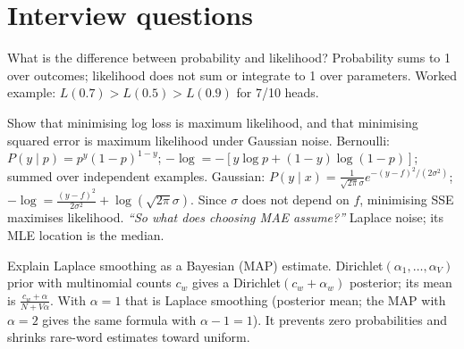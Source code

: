 \section{Interview questions}

\begin{qa}{What is the difference between probability and likelihood?}
\why Probability sums to 1 over outcomes; likelihood does not sum or integrate to 1 over parameters. Worked example: $L(0.7) > L(0.5) > L(0.9)$ for
7/10 heads.
\end{qa}

\begin{qa}{ Show that minimising log loss is maximum likelihood, and that minimising squared error is
maximum likelihood under Gaussian noise.}
\why Bernoulli: $P(y\mid p) = p^y(1-p)^{1-y}$; $-\log = -[y\log p + (1-y)\log(1-p)]$; summed over independent examples. Gaussian:
$P(y\mid x) = \frac{1}{\sqrt{2\pi}\sigma}e^{-(y - f)^2/(2\sigma^2)}$; $-\log = \frac{(y-f)^2}{2\sigma^2} + \log(\sqrt{2\pi}\sigma)$. Since $\sigma$ does not
depend on $f$, minimising SSE maximises likelihood.
\pushes \emph{``So what does choosing MAE assume?''} Laplace noise; its MLE location is the median.
\end{qa}

\begin{qa}{ Explain Laplace smoothing as a Bayesian (MAP) estimate.}
\why Dirichlet$(\alpha_1,\dots,\alpha_V)$ prior with multinomial counts $c_w$ gives a Dirichlet$(c_w + \alpha_w)$ posterior; its mean is
$\frac{c_w + \alpha}{N + V\alpha}$. With $\alpha = 1$ that is Laplace smoothing (posterior mean; the MAP with $\alpha = 2$ gives the same formula with
$\alpha - 1 = 1$). It prevents zero probabilities and shrinks rare-word estimates toward uniform.
\end{qa}


